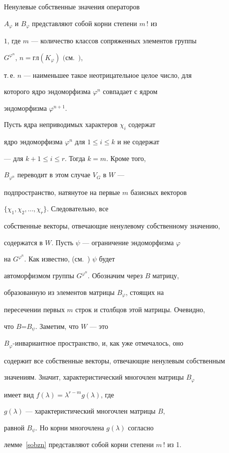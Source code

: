 \begin{thm}\label{sobzn1}


Ненулевые собственные значения операторов


$A_{\varphi}$ и $B_{\varphi}$ представляют собой корни степени $m\,!$ из


$1$, где $m$ --- количество классов сопряженных элементов группы


$G^{\varphi^{n}}$, $n={гл}(K_{\varphi})$ $($см.~\cite{Melnikov}$)$,


т.\,е. $n$ --- наименьшее такое неотрицательное целое число, для


которого ядро эндоморфизма $\varphi^{n}$ совпадает с ядром


эндоморфизма $\varphi^{n+1}$.


\end{thm}





\begin{pf} Пусть ядра неприводимых характеров $\chi_{i}$ содержат


ядро эндоморфизма $\varphi^{n}$ для $1\le i\le k$ и не содержат


--- для $k+1\le i\le r$. Тогда $k=m$. Кроме того,


$B_{\varphi^{n}}$ переводит в этом случае $V_{G}$ в $W$ ---


подпространство, натянутое на первые $m$ базисных векторов


$\{\chi_{1},\chi_{2},\dotsc,\chi_{r}\}$. Следовательно, все


собственные векторы, отвечающие ненулевому собственному значению,


содержатся в $W$. Пусть $\psi$ --- ограничение эндоморфизма $\varphi$


на $G^{\varphi^{n}}$. Как известно, (см.~\cite{Melnikov}) $\psi$ будет


автоморфизмом группы $G^{\varphi^{n}}$. Обозначим через $B$ матрицу,


образованную из элементов матрицы $B_{\varphi}$, стоящих на


пересечении первых $m$ строк и столбцов этой матрицы. Очевидно,


что $B$=$B_{\psi}$. Заметим, что $W$ --- это


$B_{\varphi}$-инвариантное пространство, и, как уже отмечалось, оно


содержит все собственные векторы, отвечающие ненулевым собственным


значениям. Значит, характеристический многочлен матрицы $B_{\varphi}$


имеет вид $f(\lambda)=\lambda^{r-m}g(\lambda)$, где


$g(\lambda)$ --- характеристический многочлен матрицы $B$,


равной $B_{\psi}$. Но корни многочлена $g(\lambda)$ согласно


лемме~\ref{sobzn} представляют собой корни степени $m\,!$ из 1.


\end{pf}





